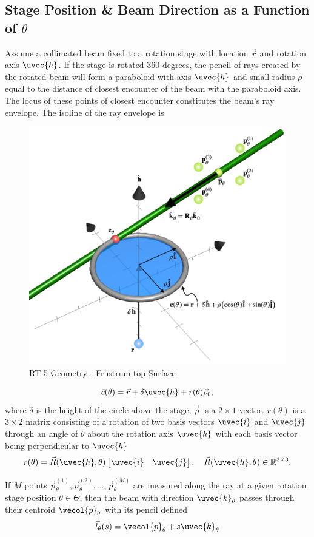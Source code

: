 \subsection{Stage Position \& Beam Direction as a Function of $\theta$}
Assume a collimated beam fixed to a rotation stage with location $\vec{r}$ and rotation axis $\uvec{h}$. If the stage is rotated 360 degrees, the pencil of rays created by the rotated beam will form a paraboloid with axis $\uvec{h}$ and small radius $\rho$ equal to the distance of closest encounter of the beam with the paraboloid axis. The locus of these points of closest encounter constitutes the beam's ray envelope.  The isoline of the ray envelope is
%
\begin{figure}
    \centering
    \includegraphics[width=0.5\linewidth]{figures/envelope_geometry.png}
    \caption{RT-5 Geometry - Frustrum top Surface}
    \label{fig:frustrum}
\end{figure}
%
\begin{equation}
    \vec{c}(\theta) = \vec{r} + \delta \uvec{h} + r(\theta) \vec{\rho}_0,
    \label{eqn:envelope}
\end{equation}
%
where $\delta$ is the height of the circle above the stage, $\vec{\rho}$ is a $2 \times 1$ vector. $r(\theta)$ is a $3 \times 2$ matrix consisting of a rotation of two basis vectors $\uvec{i}$ and $\uvec{j}$ through an angle of $\theta$ about the rotation axis $\uvec{h}$ with each basis vector being perpendicular to $\uvec{h}$
%
\begin{equation}
    r(\theta) = \vec{R}(\uvec{h}, \theta) \begin{bmatrix}
        \uvec{i} & \uvec{j}
    \end{bmatrix},
    \quad \vec{R}(\uvec{h}, \theta) \in \mathbb{R}^{3 \times 3}.
\end{equation}

If $M$ points $\vec{p}_\theta^{(1)}, \vec{p}_\theta^{(2)}, ..., \vec{p}_\theta^{(M)}$ are measured along the ray at a given rotation stage position $\theta \in \Theta$, then the beam with direction $\uvec{k}_{\theta}$ passes through their centroid $\vecol{p}_\theta$ with its pencil defined
%
\begin{align}
    \vec{l}_\theta(s) = \vecol{p}_\theta + s \uvec{k}_{\theta}
\end{align}

